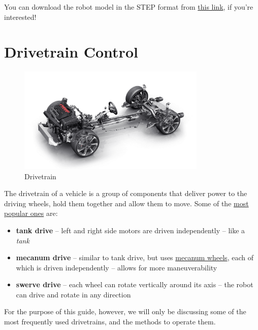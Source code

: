 \documentclass[12pt,twoside]{article}
\begin{document}
You can download the robot model in the STEP format from \href{https://grabcad.com/library/vex-edr-robot-1}{this link}, if you're interested!





\section{Drivetrain Control}




\begin{figure}[H]
\centering
\includegraphics[width=0.8\textwidth]{../assets/images/drivetrain-control/drivetrain.png}
\caption{Drivetrain}
\end{figure}


The drivetrain of a vehicle is a group of components that deliver power to the driving wheels, hold them together and allow them to move. Some of the \href{http://www.simbotics.org/resources/mobility/drivetrain-selection}{most popular ones} are:
\begin{itemize}
\item \textbf{tank drive} -- left and right side motors are driven independently -- like a \textit{tank}
\item \textbf{mecanum drive} -- similar to tank drive, but uses \href{http://www.wcproducts.net/wheels-hubs/mecanum-wheels}{mecanum wheels}, each of which is driven independently -- allows for more maneuverability
\item \textbf{swerve drive} -- each wheel can rotate vertically around its axis -- the robot can drive and rotate in any direction
\end{itemize}\vspace{\parskip}

For the purpose of this guide, however, we will only be discussing some of the most frequently used drivetrains, and the methods to operate them.
\end{document}
